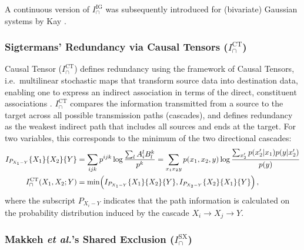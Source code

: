 \documentclass{article}
\makeatletter
\newcommand{\etalx}{\textit{et al.\@}\xspace}
\newcommand{\argct}[3]{\{#1\}\{#2\}\{#3\}}
\newcommand{\ICT}{\ensuremath{I_\cap^{\text{CT}}}\xspace}
\newcommand{\IIG}{\ensuremath{I_\cap^{\text{IG}}}\xspace}
\newcommand{\ISX}{\ensuremath{I_\cap^{\text{SX}}}\xspace}
\makeatother
\begin{document}
A continuous version of $\IIG$ was subsequently introduced for (bivariate) Gaussian systems by Kay \cite{kay2024partial}.

\subsubsection*{Sigtermans' Redundancy via Causal Tensors ($\ICT$)}

Causal Tensor (\ICT) defines redundancy using the framework of Causal Tensors, i.e.\ multilinear stochastic maps that transform source data into destination data, enabling one to express an indirect association in terms of the direct, constituent associations \cite{sigtermans2020partial, sigtermans2020towards}. \ICT compares the information transmitted from a source to the target across all possible transmission paths (cascades), and defines redundancy as the weakest indirect path that includes all sources and ends at the target. For two variables, this corresponds to the minimum of the two directional cascades:
\begin{align}
    I_{P_{X_1-Y}}\argct{X_1}{X_2}{Y} & = \sum_{ijk} p^{ijk} \log \frac{\sum_{l} A^l_iB_l^k}{p^k} = \sum_{x_1 x_2 y} p{(x_1, x_2, y)} \log \frac{\sum_{x_2'} p(x_2'|x_1)p(y|x_2')}{p(y)}  \\
    I_\cap^\text{CT}(X_1,X_2;Y) & = \min \Bigl(I_{P_{X_1-Y}}\argct{X_1}{X_2}{Y},I_{P_{X_2-Y}}\argct{X_2}{X_1}{Y} \Bigr) \,,
\end{align}
where the subscript $P_{X_i-Y}$ indicates that the path information is calculated on the probability distribution induced by the cascade $X_i \to X_j \to Y$.

\subsubsection*{Makkeh \etalx's Shared Exclusion ($\ISX$)}
\end{document}
